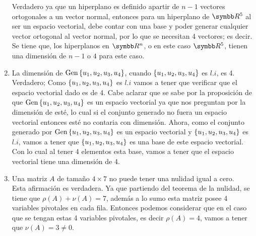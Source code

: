 \begin{enumerate}[label=\listAlph]
            Verdadero ya que un hiperplano es definido apartir de \(n - 1\) vectores ortogonales a un
            vector normal, entonces para un hiperplano de \(\realR^5\) al ser un espacio vectorial, debe contar 
            con una base y poder generar cualquier vector ortogonal al vector normal, por lo que se necesitan 4 vectores; 
            es decir. Se tiene que, los hiperplanos en \(\realR^n\), o en este caso \(\realR^5\), tienen una dimensión de \(n - 1\) o \(4\) para este caso.
        \item La dimensión de \(\text{Gen} \left\{ u_1,u_2,u_3,u_4 \right\}\), cuando \(\left\{ u_1,u_2,u_3,u_4 \right\}\) es \(l.i\), es 4. \\
            Verdadero; Como \(\left\{ u_1,u_2,u_3,u_4 \right\}\) es \(l.i\) vamos a tener que verificar que el espacio vectorial dado es de 4. 
            Cabe aclarar que se sabe por la proposición de que \(\text{Gen} \left\{ u_1,u_2,u_3,u_4 \right\}\) es un espacio vectorial ya que 
            nos preguntan por la dimensión de esté, lo cual si el conjunto generado no fuera un espacio vectorial entonces esté no contaria con dimensión.
            Ahora, como el conjunto generado por \(\text{Gen} \left\{ u_1,u_2,u_3,u_4 \right\}\) es un espacio vectorial y \(\left\{ u_1,u_2,u_3,u_4 \right\}\) es \(l.i\), vamos a 
            tener que \(\left\{ u_1,u_2,u_3,u_4 \right\}\) es una base de este espacio vectorial. Con lo cual al tener 4 elementos esta base, vamos a tener que
            el espacio vectorial tiene una dimensión de 4.
            \setcounter{enumii}{14}
        \item Una matriz \(A\) de tamaño \(4 \times 7\) no puede tener una nulidad igual a cero. \\
            Esta afirmación es verdadera. Ya que partiendo del teorema de la nulidad, se tiene que \(\rho(A) + \nu(A) = 7\), 
            además a lo sumo esta matriz posee 4 variables pivotales en cada fila. Entonces podemos considerar que en el caso que se 
            tengan estas 4 variables pivotales, es decir \(\rho(A) = 4\), vamos a tener que \(\nu(A) = 3 \neq 0\).
    \end{enumerate}
